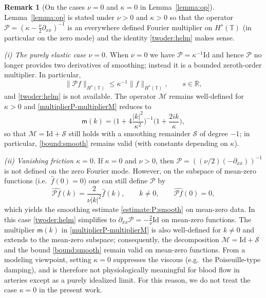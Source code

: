 \documentclass[reqno]{amsart}
\newcommand{\RR}{\mathbb R}
\newcommand{\TT}{\mathbb T}
\newcommand{\Id}{\mathrm{Id}}
\theoremstyle{definition}
\newtheorem{remark}[theorem]{Remark}
\numberwithin{equation}{section}
\numberwithin{theorem}{section}
\numberwithin{definition}{section}
\begin{document}
\begin{remark}[On the cases $\nu=0$ and $\kappa=0$ in Lemma~\ref{lemma:op}]\label{rem:nu0-kappa0}
	Lemma~\ref{lemma:op} is stated under $\nu>0$ and $\kappa>0$ so that the operator
	$\mathcal P=(\kappa-\frac{\nu}{2}\partial_{xx})^{-1}$ is an everywhere defined Fourier multiplier on $H^s(\TT)$
	(in particular on the zero mode) and the identity \eqref{twoder:helm} makes sense.
	
	\smallskip
	\noindent\emph{(i) The purely elastic case $\nu=0$.}
	When $\nu=0$ we have $\mathcal P=\kappa^{-1}\Id$ and hence $\mathcal P$ no longer provides two derivatives of smoothing;
	instead it is a bounded zeroth-order multiplier. In particular,
	\[
	\|\mathcal P f\|_{H^s(\TT)}\le \kappa^{-1}\|f\|_{H^s(\TT)},\qquad s\in\RR,
	\]
	and \eqref{twoder:helm} is not available. The operator $\mathcal M$ remains well-defined for $\kappa>0$ and
	\eqref{multiplierP-multiplierM} reduces to
	\[
	\mathsf{m}(k)=\Big(1+4\frac{|k|^2}{\kappa^2}\Big)^{-1}\Big(1+\frac{2ik}{\kappa}\Big),
	\]
	so that $\mathcal M=\Id+\mathcal S$ still holds with a smoothing remainder $\mathcal S$ of degree $-1$; in particular,
	\eqref{bound:smooth} remains valid (with constants depending on $\kappa$).
	
	\smallskip
	\noindent\emph{(ii) Vanishing friction $\kappa=0$.}
	If $\kappa=0$ and $\nu>0$, then $\mathcal P=((\nu/2)(-\partial_{xx}))^{-1}$ is not defined on the zero Fourier mode.
	However, on the subspace of mean-zero functions (i.e.\ $\widehat f(0)=0$) one can still define $\mathcal P$ by
	\[
	\widehat{\mathcal P f}(k)=\frac{2}{\nu|k|^2}\widehat f(k),\qquad k\neq 0,\qquad \widehat{\mathcal P f}(0)=0,
	\]
	which yields the smoothing estimate \eqref{estimate:P:smooth} on mean-zero data.
	In this case \eqref{twoder:helm} simplifies to $\partial_{xx}\mathcal P=-\frac{2}{\nu}\Id$ on mean-zero functions.
	The multiplier $\mathsf{m}(k)$ in \eqref{multiplierP-multiplierM} is also well-defined for $k\neq 0$ and extends to
	the mean-zero subspace; consequently, the decomposition $\mathcal M=\Id+\mathcal S$ and the bound \eqref{bound:smooth}
	remain valid on mean-zero functions. From a modeling viewpoint, setting $\kappa=0$ suppresses the viscous (e.g.\ the Poiseuille-type damping), and is therefore not physiologically meaningful for blood flow in arteries except as a purely idealized limit. For this reason, we do not treat the case $\kappa=0$ in the present work.
\end{remark}
\end{document}
